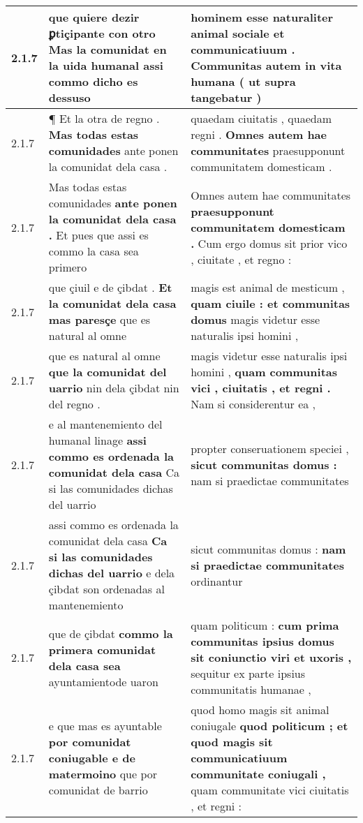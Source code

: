 \begin{tabular}{|p{1cm}|p{6.5cm}|p{6.5cm}|}
2.1.7 & que quiere dezir ꝑtiçipante con otro \textbf{ Mas la comunidat en la uida humanal } assi commo dicho es dessuso & hominem esse naturaliter animal sociale et communicatiuum . \textbf{ Communitas autem in vita humana } ( ut supra tangebatur ) \\\hline
2.1.7 & ¶ Et la otra de regno . \textbf{ Mas todas estas comunidades } ante ponen la comunidat dela casa . & quaedam ciuitatis , quaedam regni . \textbf{ Omnes autem hae communitates } praesupponunt communitatem domesticam . \\\hline
2.1.7 & Mas todas estas comunidades \textbf{ ante ponen la comunidat dela casa . } Et pues que assi es commo la casa sea primero & Omnes autem hae communitates \textbf{ praesupponunt communitatem domesticam . } Cum ergo domus sit prior vico , ciuitate , et regno : \\\hline
2.1.7 & que çiuil e de çibdat . \textbf{ Et la comunidat dela casa mas paresçe } que es natural al omne & magis est animal de mesticum , \textbf{ quam ciuile : et communitas domus } magis videtur esse naturalis ipsi homini , \\\hline
2.1.7 & que es natural al omne \textbf{ que la comunidat del uarrio } nin dela çibdat nin del regno . & magis videtur esse naturalis ipsi homini , \textbf{ quam communitas vici , ciuitatis , et regni . } Nam si considerentur ea , \\\hline
2.1.7 & e al mantenemiento del humanal linage \textbf{ assi commo es ordenada la comunidat dela casa } Ca si las comunidades dichas del uarrio & propter conseruationem speciei , \textbf{ sicut communitas domus : } nam si praedictae communitates \\\hline
2.1.7 & assi commo es ordenada la comunidat dela casa \textbf{ Ca si las comunidades dichas del uarrio } e dela çibdat son ordenadas al mantenemiento & sicut communitas domus : \textbf{ nam si praedictae communitates } ordinantur \\\hline
2.1.7 & que de çibdat \textbf{ commo la primera comunidat dela casa sea } ayuntamientode uaron & quam politicum : \textbf{ cum prima communitas ipsius domus sit coniunctio viri et uxoris , } sequitur ex parte ipsius communitatis humanae , \\\hline
2.1.7 & e que mas es ayuntable \textbf{ por comunidat coniugable e de matermoino } que por comunidat de barrio & quod homo magis sit animal coniugale \textbf{ quod politicum ; et quod magis sit communicatiuum communitate coniugali , } quam communitate vici ciuitatis , et regni : \\\hline

\end{tabular}
